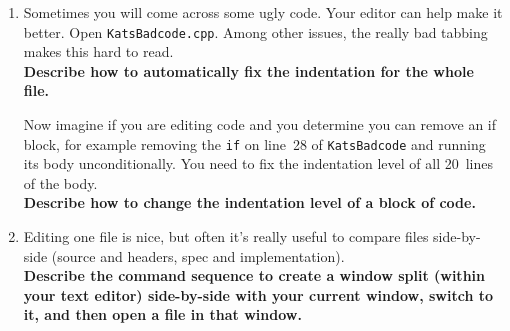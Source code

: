 \documentclass{article}
\begin{document}
\begin{enumerate}
  \item Sometimes you will come across some ugly code. Your editor can help
    make it better. Open \texttt{KatsBadcode.cpp}. Among other issues, the
    really bad tabbing makes this hard to read.\\
    \textbf{Describe how to automatically fix the indentation for the whole file.}
    \vspace{6em}

    Now imagine if you are editing code and you determine you can
        remove an if block, for example removing the \texttt{if} on line~28 of
        \texttt{KatsBadcode} and running its body unconditionally. You need to
        fix the indentation level of all 20~lines of the body.\\
        \textbf{Describe how to change the indentation level of a block of code.}
        \vspace{4em}
  \item Editing one file is nice, but often it's really useful to compare
    files side-by-side (source and headers, spec and implementation).\\
    \textbf{Describe the command sequence to create a window split (within your
        text editor) side-by-side with your current window, switch to it, and then open a file in that window.}\\
    \vspace{6em}


\end{enumerate}
\end{document}
